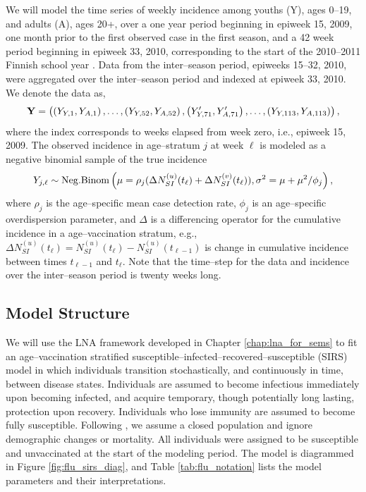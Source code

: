 We will model the time series of weekly incidence among youths (Y), ages 0--19, and adults (A), ages 20+, over a one year period beginning in epiweek 15, 2009, one month prior to the first observed case in the first season, and a 42 week period beginning in epiweek 33, 2010, corresponding to the start of the 2010--2011 Finnish school year \cite{calendarFinland}. Data from the inter--season period, epiweeks 15--32, 2010, were aggregated over the inter--season period and indexed at epiweek 33, 2010. We denote the data as, $$ \mathbf{Y} = \left (\left (Y_{Y,1},Y_{A,1}\right ),\dots,\left (Y_{Y,52},Y_{A,52}\right ),\left (Y^\prime_{Y,71},Y^\prime_{A,71}\right ),\dots,\left (Y_{Y,113},Y_{A,113}\right )\right ), $$ where the index corresponds to weeks elapsed from week zero, i.e., epiweek 15, 2009. The observed incidence in age--stratum $ j $ at week $ \ell $ is modeled as a negative binomial sample of the true incidence \begin{equation}
\label{flu_emit_prob}
Y_{j,\ell} \sim \mathrm{Neg.Binom}\left (\mu = \rho_j(\Delta N_{SI}^{(u)}(t_\ell) + \Delta N_{SI}^{(v)}(t_\ell)), \sigma^2 = \mu + \mu^2 / \phi_j\right ),
\end{equation}
where $ \rho_j $ is the age--specific mean case detection rate, $ \phi_j $ is an age--specific overdispersion parameter, and $ \Delta $ is a differencing operator for the cumulative incidence in a age--vaccination stratum, e.g., $ \Delta N_{SI}^{(u)}(t_\ell) = N_{SI}^{(u)}(t_\ell) - N_{SI}^{(u)}(t_{\ell-1}) $ is change in cumulative incidence between times $ t_{\ell-1} $ and $ t_\ell $. Note that the time--step for the data and incidence over the inter--season period is twenty weeks long. 

\subsection{Model Structure}
\label{subsec:flu_modstructure}

We will use the LNA framework developed in Chapter \ref{chap:lna_for_sems} to fit an age--vaccination stratified susceptible--infected--recovered--susceptible (SIRS) model in which individuals transition stochastically, and continuously in time, between disease states. Individuals are assumed to become infectious immediately upon becoming infected, and acquire temporary, though potentially long lasting, protection upon recovery. Individuals who lose immunity are assumed to become fully susceptible. Following \cite{shubin2016revealing}, we assume a closed population and ignore demographic changes or mortality. All individuals were assigned to be susceptible and unvaccinated at the start of the modeling period. The model is diagrammed in Figure \ref{fig:flu_sirs_diag}, and Table \ref{tab:flu_notation} lists the model parameters and their interpretations. 

